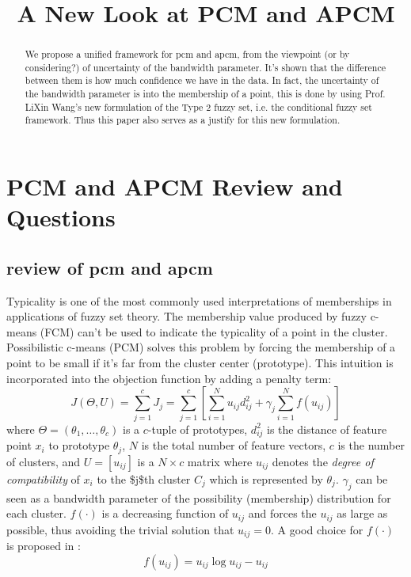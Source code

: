\documentclass[journal]{IEEEtran}
\date{}
\title{A New Look at PCM and APCM}
\begin{document}
\maketitle
\begin{abstract}
We propose a unified framework for pcm and apcm, from the viewpoint (or by considering?) of uncertainty of the bandwidth parameter. It's shown that the difference between them is how much confidence we have in the data. In fact, the uncertainty of the bandwidth parameter is into the membership of  a point, this is done by using Prof. LiXin Wang's new formulation of the Type 2 fuzzy set, i.e. the conditional fuzzy set framework. Thus this paper also serves as a justify for this new formulation.
\end{abstract}

\section{PCM and APCM Review and Questions}
\label{sec-1}
\subsection{review of pcm and apcm}
\label{sec-1-1}
Typicality is one of the most commonly used interpretations of memberships in applications of fuzzy set theory. The membership value produced by fuzzy c-means (FCM) \cite{bezdek_pattern_2013} can't be used to indicate the typicality of a point in the cluster. Possibilistic c-means (PCM) \cite{krishnapuram_possibilistic_1993} solves this problem by forcing the membership of a point to be small if it's far from the cluster center (prototype). This intuition is incorporated into the objection function by adding a penalty term:
\begin{equation}
J(\Theta,U)=\sum_{j=1}^{c}J_j=\sum_{j=1}^{c}\left[\sum_{i=1}^{N}u_{ij}d_{ij}^2+\gamma_j \sum_{i=1}^{N}f(u_{ij})\right]
\end{equation}
where $\Theta=(\theta_1,\ldots,\theta_c)$ is a $c$-tuple of prototypes, $d_{ij}^2$ is the distance of feature point $x_i$ to prototype $\theta_j$, $N$ is the total number of feature vectors, $c$ is the number of clusters, and $U=[u_{ij}]$ is a $N\times c$ matrix where $u_{ij}$ denotes the \emph{degree of compatibility} of $x_i$ to the \$j\$th cluster $C_j$ which is represented by $\theta_j$. $\gamma_j$ can be seen as a bandwidth parameter of the possibility (membership) distribution for each cluster. $f(\cdot)$ is a decreasing function of $u_{ij}$ and forces the $u_{ij}$ as large as possible, thus avoiding the trivial solution that $u_{ij}=0$. A good choice for $f(\cdot)$ is proposed in \cite{krishnapuram_possibilistic_1996}:
\begin{equation}
f(u_{ij})=u_{ij}\log u_{ij}-u_{ij}
\end{equation}
\end{document}
